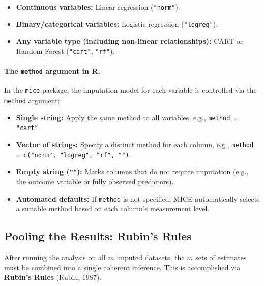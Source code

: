 \documentclass[11pt]{article}
\theoremstyle{smallexample}
\begin{document}
 \begin{itemize}
  \item \textbf{Continuous variables:} Linear regression (\texttt{"norm"}).
  \vspace{0.2cm}
  \item \textbf{Binary/categorical variables:} Logistic regression
    (\texttt{"logreg"}).
  \vspace{0.2cm}
  \item \textbf{Any variable type (including non-linear relationships):}
    CART or Random Forest (\texttt{"cart"}, \texttt{"rf"}).
 \end{itemize}

\paragraph{The \texttt{method} argument in R.} In the \texttt{mice} package, the
imputation model for each variable is controlled via the \texttt{method} argument:

 \begin{itemize}
  \item \textbf{Single string:} Apply the same method to all variables, e.g.,
    \texttt{method = "cart"}.

  \vspace{0.2cm}
  \item \textbf{Vector of strings:} Specify a distinct method for each column, e.g.,
    \texttt{method = c("norm", "logreg", "rf", "")}.

  \vspace{0.2cm}
  \item \textbf{Empty string (\texttt{""}):} Marks columns that do not require
    imputation (e.g., the outcome variable or fully observed predictors).

  \vspace{0.2cm}
  \item \textbf{Automated defaults:} If \texttt{method} is not specified, MICE
    automatically selects a suitable method based on each column's measurement level.
 \end{itemize}

\subsection{Pooling the Results: Rubin's Rules}

After running the analysis on all $m$ imputed datasets, the $m$ sets of estimates must
be combined into a single coherent inference. This is accomplished via
\textbf{Rubin's Rules} (Rubin, 1987).
\end{document}
